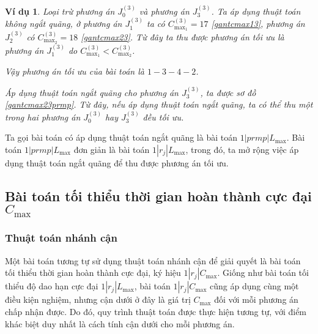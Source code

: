 \documentclass[12pt,a4paper]{report}
\newtheorem{vd}{Ví dụ}
\begin{document}
\begin{vd}
Loại trừ phương án $J_0^{(3)}$ và phương án $J_3^{(3)}$. Ta áp dụng thuật toán không ngắt quãng, ở phương án $J_1^{(3)}$ ta có $C_{\max _1}^{(3)} = 17$ \eqref{gantcmax13}, phương án $J_2^{(3)}$ có $C_{\max _2}^{(3)} = 18$ \eqref{gantcmax23}. Từ đây ta thu được phương án tối ưu là phương án $J_1^{(3)}$ do $C_{\max _1}^{(3)} < C_{\max _2}^{(3)}$.

Vậy phương án tối ưu của bài toán là $1-3-4-2$.

Áp dụng thuật toán ngắt quãng cho phương án $J_3^{(3)}$, ta được sơ đồ \eqref{gantcmax23prmp}. Từ đây, nếu áp dụng thuật toán ngắt quãng, ta có thể thu một trong hai phương án $J_0^{(3)}$ hay $J_3^{(3)}$ đều tối ưu.

\end{vd}

Ta gọi bài toán có áp dụng thuật toán ngắt quãng là bài toán $1|prmp|L_{\max}$. Bài toán $1|prmp|L_{\max}$ đơn giản là bài toán $1|r_j|L_{\max}$, trong đó, ta mở rộng việc áp dụng thuật toán ngắt quãng để thu được phương án tối ưu.


\subsection{Bài toán tối thiểu thời gian hoàn thành cực đại $C_{\max}$}




\subsubsection*{Thuật toán nhánh cận}

Một bài toán tương tự sử dụng thuật toán nhánh cận để giải quyết là bài toán tối thiểu thời gian hoàn thành cực đại, ký hiệu $1|r_j|C_{\max}$. Giống như bài toán tối thiểu độ dao hạn cực đại $1|r_j|L_{\max}$, bài toán $1|r_j|C_{\max}$ cũng áp dụng cùng một điều kiện nghiệm, nhưng cận dưới ở đây là giá trị $C_{\max}$ đối với mỗi phương án chấp nhận được. Do đó, quy trình thuật toán được thực hiện tương tự, với điểm khác biệt duy nhất là cách tính cận dưới cho mỗi phương án.
\end{document}
